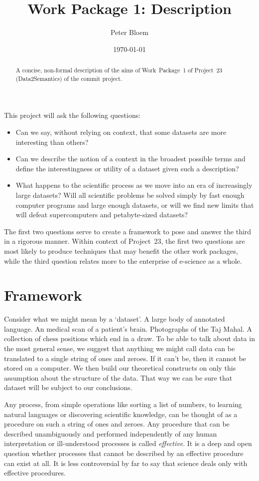 \documentclass{article}
\title{Work Package 1: Description}
\date{\today}
\author{Peter Bloem}
\begin{document}
\maketitle

\begin{abstract}
\noindent A concise, non-formal description of the aims of Work~Package~1 of
Project~23 (Data2Semantics) of the {\sc commit} project.
\end{abstract}

This project will ask the following questions:
\begin{itemize}
  \item Can we say, without relying on context, that some datasets are more interesting than others?
  \item Can we describe the notion of a context in the broadest possible terms and define the interestingness or utility of a dataset given such a description?
  \item What happens to the scientific process as we move into an era of
  increasingly large datasets? Will all scientific problems be solved simply by
  fast enough computer programs and large enough datasets, or will we find new
  limits that will defeat supercomputers and petabyte-sized datasets?
\end{itemize}

The first two questions serve to create a framework to pose and answer the third in a rigorous manner. Within context of Project~23, the first two questions are most likely to produce techniques that may benefit the other work packages, while the third question relates more to the enterprise of e-science as a whole.

\section*{Framework}

Consider what we might mean by a `dataset'. A large body of annotated language. An medical scan of a patient's brain. Photographs of the Taj Mahal. A collection of chess positions which end in a draw. To be able to talk about data in the most general sense, we suggest that anything we might call data can be translated to a single string of ones and zeroes. If it can't be, then it cannot be stored on a computer. We then build our theoretical constructs on only this assumption about the structure of the data. That way we can be sure that dataset will be subject to our conclusions.

Any process, from simple operations like sorting a list of numbers, to learning natural languages or discovering scientific knowledge, can be thought of as a procedure on such a string of ones and zeroes. Any procedure that can be described unambiguously and performed independently of any human interpretation or ill-understood processes is called \emph{effective}. It is a deep and open question whether processes that cannot be described by an effective procedure can exist at all. It is less controversial by far to say that science deals only with effective procedures.
\end{document}
